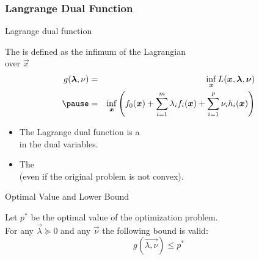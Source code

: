 \begin{frame}
  \frametitle{Langrange Dual Function}
  
  \begin{citeblock}{Lagrange dual function}

     The  is defined as the infimum of the Lagrangian \\
     over $\vec{x}$
     \begin{eqnarray*}
       g(\vec{\lambda,\nu}) 
         & = & \inf_{\vec{x}}L(\vec{x},\vec{\lambda}, \vec{\nu}) \\ \pause 
         & = & \inf_{\vec{x}} \left(   
                                f_0(\vec{x}) + \sum_{i=1}^m\lambda_i f_i(\vec{x}) + 
                                \sum_{i=1}^p\nu_i h_i(\vec{x})
                              \right)
    \end{eqnarray*}
  \end{citeblock}
  \pspread
  
  
  \begin{itemize}
    \item The Lagrange dual function is a  \\
      in the dual variables. \pause 
    \item The  \\
      (even if the original problem is not convex).
  \end{itemize}

\end{frame}


\begin{frame}{Optimal Value and Lower Bound}

  \begin{lemma}
    Let $p^*$ be the optimal value of the optimization problem. \\
    For any $\vec\lambda \succeq 0$ and any $\vec \nu$ the following bound is valid:
    \begin{displaymath}
      g(\vec{\lambda,\nu}) \leq p^* 
    \end{displaymath} 
  \end{lemma}
\end{frame}


